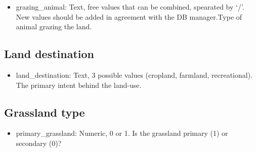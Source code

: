 \documentclass[table]{article}
\providecommand{\tightlist}{%
  \setlength{\itemsep}{0pt}\setlength{\parskip}{0pt}}
\begin{document}
\begin{itemize}
\tightlist
\item
  grazing\_animal: Text, free values that can be combined, spearated by
  `/'. New values should be added in agreement with the DB manager.Type
  of animal grazing the land.
\end{itemize}

\subsection{Land destination}\label{land-destination}

\begin{itemize}
\tightlist
\item
  land\_destination: Text, 3 possible values (cropland, farmland,
  recreational). The primary intent behind the land-use.
\end{itemize}

\subsection{Grassland type}\label{grassland-type}

\begin{itemize}
\tightlist
\item
  primary\_grassland: Numeric, 0 or 1. Is the grassland primary (1) or
  secondary (0)?
\end{itemize}
\end{document}
